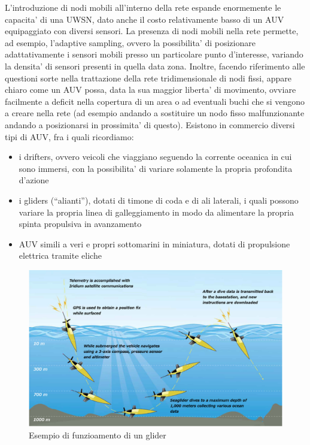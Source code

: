 L'introduzione di nodi mobili all'interno della rete espande enormemente le capacita' di una UWSN, dato anche il costo relativamente basso di un AUV equipaggiato con diversi sensori. La presenza di nodi mobili nella rete permette, ad esempio, l'adaptive sampling, ovvero la possibilita' di posizionare adattativamente i sensori mobili presso un particolare punto d'interesse, variando la densita' di sensori presenti in quella data zona. Inoltre, facendo riferimento alle questioni sorte nella trattazione della rete tridimensionale di nodi fissi, appare chiaro come un AUV possa, data la sua maggior liberta' di movimento, ovviare facilmente a deficit nella copertura di un area o ad eventuali buchi che si vengono a creare nella rete (ad esempio andando a sostituire un nodo fisso malfunzionante andando a posizionarsi in prossimita' di questo).
Esistono in commercio diversi tipi di AUV, fra i quali ricordiamo:
\begin{itemize}

\item i drifters, ovvero veicoli che viaggiano seguendo la corrente oceanica in cui sono immersi, con la possibilita' di variare solamente la propria
profondita d'azione

\item i gliders (``alianti''), dotati di timone di coda e di ali laterali, i quali possono variare la propria linea di galleggiamento in modo da alimentare la propria spinta propulsiva in avanzamento

\item AUV simili a veri e propri sottomarini in miniatura, dotati di propulsione elettrica tramite eliche

\end{itemize}
\begin{figure}[H]
    \centering
	\includegraphics[width=\linewidth]{glider.jpg}
	\caption{ Esempio di funzioamento di un glider}
	\label{fig:}
\end{figure}


